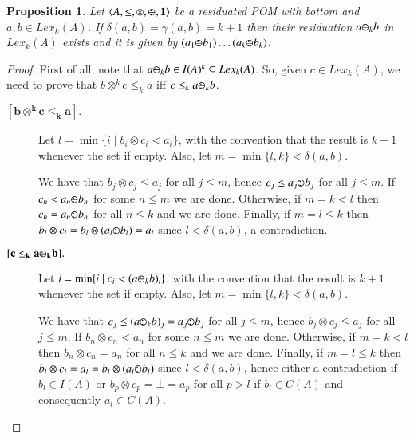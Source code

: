 \documentclass[a4paper]{elsarticle}
\newtheorem{proposition}{Proposition}
\newcommand{\monop}{\otimes}
\newcommand{\1}{\mathbf{1}}
\def\odiv{{ \ominus\hspace{-8pt}:}\;}
\begin{document}
\begin{proposition}
	\label{div0}
	Let $\langle A, \leq, \monop, \odiv, \1 \rangle$
	be a residuated POM with bottom and $a, b \in Lex_k(A)$.
	If $\delta(a,b) = \gamma(a,b) = k+1$
	then their residuation $a \odiv_k b$ 
	in $Lex_k(A)$ exists and it is given by 
	$(a_1 \odiv b_1) \ldots  (a_k \odiv b_k)$.
\end{proposition}

\begin{proof}
	First of all, note that 
	$a \odiv_k b \in I(A)^k \subseteq Lex_k(A)$.
	So, given $c \in Lex_k(A)$, we need to prove that
	$b\otimes^k c \leq_k a$ iff $c \leq_k a \odiv_k b$.
	
	\begin{description}
		\item[$\mathbf{[b\otimes^k c \leq_k a].}$]
		Let $l = \min \{ i \mid b_i \otimes c_i < a_i\}$,
		with the convention that the result is $k+1$ whenever the set if empty.
		Also, let $m = \min\{l, k\} < \delta(a,b)$.
		
		We have that $b_j \otimes c_j \leq a_j$ for all $j \leq m$, hence
		$c_j \leq a_j \odiv b_j $ for all $j \leq m$. 
		If $c_n < a_n \odiv b_n$ for some $n \leq m$
		we are done. 
		Otherwise, if $m = k < l$ then 
		$c_n = a_n \odiv b_n$ for all $n \leq k$ and we are done.
		Finally, if $m = l \leq k $ then 
		$b_l \otimes c_l = b_l  \otimes (a_l \odiv b_l) = a_l$
		since $l < \delta(a,b)$, a contradiction.
		
		\item[$\mathbf{[c \leq_k a \odiv_k b].}$]
		Let $l = \min \{ i \mid c_i < (a \odiv_k b)_i\}$,
		with the convention that the result is $k+1$ whenever the set if empty.
		Also, let $m = \min \{l, k\} < \delta(a,b)$.
		
		We have that $c_j \leq (a \odiv_k b)_j = a_j \odiv b_j$ for all $j \leq m$, hence
		$b_j \otimes c_j \leq a_j$ for all $j \leq m$.
		If $b_n \otimes c_n < a_n$ for some $n \leq m$
		we are done. 
		Otherwise, if $m = k < l$ then 
		$b_n \otimes c_n = a_n$ for all $n \leq k$	and we are done.
		Finally, if $m = l \leq k$ then 
		$b_l \otimes c_l = a_l = b_l \otimes (a_l \odiv b_l)$
		since $l < \delta(a,b)$, hence either a contradiction
		if $b_l \in I(A)$ or $b_p \otimes c_p = \bot = a_p$ for all $p > l$
		if $b_l \in C(A)$ and consequently $a_l \in C(A)$. \qedhere
	\end{description}
\end{proof}
\end{document}
